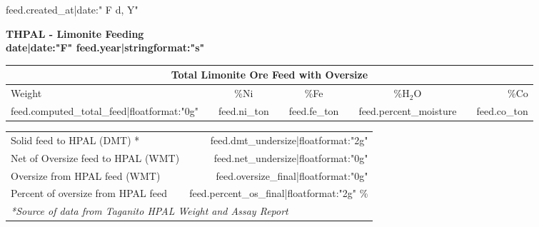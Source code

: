 \documentclass[10pt]{article}
\begin{document}

\begin{flushright}
	{{ feed.created_at|date:" F d, Y"}}
\end{flushright}

\vspace{2cm}

\begin{center}
	\textbf{\Large THPAL - Limonite Feeding}\\
	\textbf{\large {{ date|date:"F" }} {{ feed.year|stringformat:"s" }}}
\end{center}

	\begin{table}[h!]
		\centering
		\renewcommand{\arraystretch}{1.5}
    	\large
		\begin{tabularx}{0.9\linewidth}{@{\hspace{3mm}}lXcXcXcXr@{\hspace{3mm}}}
			\multicolumn{9}{c}{\textbf{Total Limonite Ore Feed with Oversize}} \\
			\toprule
			Weight
				&& \%Ni
				&& \%Fe
				&& \%H$_2$O
				&& \%Co \\
			{{ feed.computed_total_feed|floatformat:"0g" }}
				&& {{ feed.ni_ton }}
				&& {{ feed.fe_ton }}
				&& {{ feed.percent_moisture }}
				&& {{ feed.co_ton }} \\
			\bottomrule
		\end{tabularx}

	\end{table}


	\begin{table}[h!]
		\centering
		\renewcommand{\arraystretch}{1.1}
		\setlength{\tabcolsep}{10pt}
		\begin{tabular}{l r}
			\midrule
			Solid feed to HPAL (DMT) * & {{ feed.dmt_undersize|floatformat:"2g" }} \\
			Net of Oversize feed to HPAL (WMT) & {{ feed.net_undersize|floatformat:"0g" }} \\
			Oversize from HPAL feed (WMT) & {{ feed.oversize_final|floatformat:"0g" }}\\
			Percent of oversize from HPAL feed & {{ feed.percent_os_final|floatformat:"2g" }} \% \\
			\midrule
			\multicolumn{2}{l}{\textit{*Source of data from Taganito HPAL Weight and Assay Report}} \\
		\end{tabular}
	\end{table}
\end{document}
